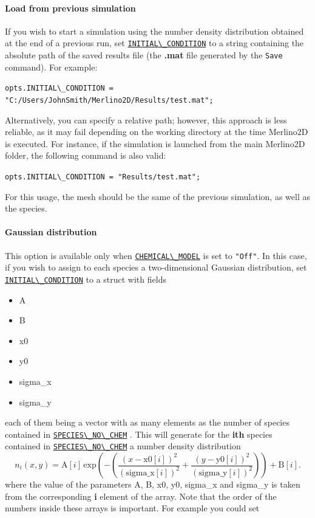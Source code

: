 \documentclass[12pt,a4paper]{article}
\newcommand{\matlabs}[1]{{\lstinline[style=MatlabStyle]!#1!}}
\newcommand{\seclink}[2]{%
	\begingroup
	\hypersetup{linkcolor=orange}%
	\hyperref[sec:#1]{\matlabs{#2}}%
	\endgroup
}
\begin{document}
	\paragraph{Load from previous simulation}
	If you wish to start a simulation using the number density distribution obtained at the end of a previous run, set \seclink{initial}{INITIAL\_CONDITION} to a string containing the absolute path of the saved results file (the \textbf{.mat} file generated by the \matlabs{Save} command). For example:
	
	\matlabs{opts.INITIAL\_CONDITION = "C:/Users/JohnSmith/Merlino2D/Results/test.mat";}
	
	\noindent Alternatively, you can specify a relative path; however, this approach is less reliable, as it may fail depending on the working directory at the time Merlino2D is executed.
	For instance, if the simulation is launched from the main Merlino2D folder, the following command is also valid:
	
	\matlabs{opts.INITIAL\_CONDITION = "Results/test.mat";}
	
	\noindent For this usage, the mesh should be the same of the previous simulation, as well as the species.
	
	\paragraph{Gaussian distribution}
	This option is available only when \seclink{chemicalmodel}{CHEMICAL\_MODEL} is set to \matlabs{"Off"}.
	In this case, if you wish to assign to each species a two-dimensional Gaussian distribution, set \seclink{initial}{INITIAL\_CONDITION} to a struct with fields
	\begin{itemize}
		\item A
		\item B
		\item x0
		\item y0
		\item sigma\_x
		\item sigma\_y
	\end{itemize}
	each of them being a vector with as many elements as the number of species contained in \seclink{speciesnochem}{SPECIES\_NO\_CHEM}. This will generate for the \textbf{ith} species contained in \seclink{speciesnochem}{SPECIES\_NO\_CHEM} a number density distribution
	\[
	n_i(x,y) = \boldsymbol{\mathrm{A}}[i] \, \mathrm{exp}\!\!\left(-\left(\frac{(x-\boldsymbol{\mathrm{x0}}[i])^2}{(\boldsymbol{\mathrm{sigma\_x}}[i])^2} + \frac{(y-\boldsymbol{\mathrm{y0}}[i])^2}{(\boldsymbol{\mathrm{sigma\_y}}[i])^2}\right)\right) + \boldsymbol{\mathrm{B}}[i].
	\]
	where the value of the parameters A, B, x0, y0, sigma\_x and sigma\_y is taken from the corresponding \textbf{i} element of the array. Note that the order of the numbers inside these arrays is important. For example you could set
	
\end{document}
